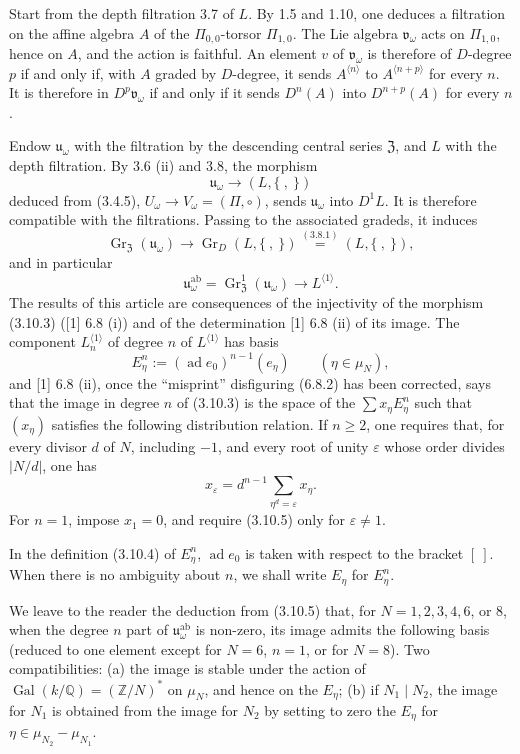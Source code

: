 \documentclass[10pt,a4paper]{article}
\newcommand{\muN}{\mu_N}
\newcommand{\Q}{\mathbb Q}
\newcommand{\Z}{\mathbb Z}
\newcommand{\Gal}{\operatorname{Gal}}
\newcommand{\Gr}{\operatorname{Gr}}
\newcommand{\ad}{\operatorname{ad}}
\newcommand{\uomega}{\mathfrak u_\omega}
\newcommand{\vomega}{\mathfrak v_\omega}
\newcommand{\Zcen}{\mathfrak Z}
\theoremstyle{deligne}
\newcommand{\heading}[1]{\vspace{0.65em}\noindent{\bfseries #1}\quad}
\begin{document}
Start from the depth filtration 3.7 of \(L\). By 1.5 and 1.10, one deduces a filtration on the affine algebra \(A\) of the \(\Pi_{0,0}\)-torsor \(\Pi_{1,0}\). The Lie algebra \(\vomega\) acts on \(\Pi_{1,0}\), hence on \(A\), and the action is faithful. An element \(v\) of \(\vomega\) is therefore of \(D\)-degree \(p\) if and only if, with \(A\) graded by \(D\)-degree, it sends \(A^{\langle n\rangle}\) to \(A^{\langle n+p\rangle}\) for every \(n\). It is therefore in \(D^p\vomega\) if and only if it sends \(D^n(A)\) into \(D^{n+p}(A)\) for every \(n\).

\heading{3.10.} Endow \(\uomega\) with the filtration by the descending central series \(\Zcen\), and \(L\) with the depth filtration. By 3.6 (ii) and 3.8, the morphism
\[
\tag{3.10.1}
\uomega\longrightarrow (L,\{\ ,\ \})
\]
deduced from (3.4.5), \(U_\omega\to V_\omega=(\Pi,\circ)\), sends \(\uomega\) into \(D^1L\). It is therefore compatible with the filtrations. Passing to the associated gradeds, it induces
\[
\tag{3.10.2}
\Gr_{\Zcen}(\uomega)\longrightarrow \Gr_D(L,\{\ ,\ \})\overset{(3.8.1)}{=}(L,\{\ ,\ \}),
\]
and in particular
\[
\tag{3.10.3}
\uomega^{\mathrm{ab}}=\Gr_{\Zcen}^1(\uomega)\longrightarrow L^{\langle1\rangle}.
\]
The results of this article are consequences of the injectivity of the morphism (3.10.3) ([1] 6.8 (i)) and of the determination [1] 6.8 (ii) of its image. The component \(L_n^{\langle1\rangle}\) of degree \(n\) of \(L^{\langle1\rangle}\) has basis
\[
\tag{3.10.4}
E_\eta^n:=(\ad e_0)^{n-1}(e_\eta)\qquad(\eta\in\muN),
\]
and [1] 6.8 (ii), once the ``misprint'' disfiguring (6.8.2) has been corrected, says that the image in degree \(n\) of (3.10.3) is the space of the \(\sum x_\eta E_\eta^n\) such that \((x_\eta)\) satisfies the following distribution relation. If \(n\ge2\), one requires that, for every divisor \(d\) of \(N\), including \(-1\), and every root of unity \(\varepsilon\) whose order divides \(|N/d|\), one has
\[
\tag{3.10.5}
x_\varepsilon=d^{n-1}\sum_{\eta^d=\varepsilon}x_\eta.
\]
For \(n=1\), impose \(x_1=0\), and require (3.10.5) only for \(\varepsilon\ne1\).

In the definition (3.10.4) of \(E_\eta^n\), \(\ad e_0\) is taken with respect to the bracket \([\ ]\). When there is no ambiguity about \(n\), we shall write \(E_\eta\) for \(E_\eta^n\).

\heading{3.11.} We leave to the reader the deduction from (3.10.5) that, for \(N=1,2,3,4,6\), or \(8\), when the degree \(n\) part of \(\uomega^{\mathrm{ab}}\) is non-zero, its image admits the following basis (reduced to one element except for \(N=6\), \(n=1\), or for \(N=8\)). Two compatibilities: (a) the image is stable under the action of \(\Gal(k/\Q)=(\Z/N)^*\) on \(\muN\), and hence on the \(E_\eta\); (b) if \(N_1\mid N_2\), the image for \(N_1\) is obtained from the image for \(N_2\) by setting to zero the \(E_\eta\) for \(\eta\in\mu_{N_2}-\mu_{N_1}\).
\end{document}
